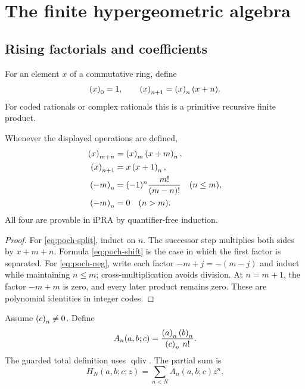 \section{The finite hypergeometric algebra}\label{sec:series}

\subsection{Rising factorials and coefficients}

\begin{definition}\label{def:pochhammer}
For an element \(x\) of a commutative ring, define
\[
  \left(x\right)_{0}=1,
  \qquad
  \left(x\right)_{n+1}=\left(x\right)_{n}(x+n).
\]
For coded rationals or complex rationals this is a primitive recursive finite
product.
\end{definition}

\begin{lemma}\label{lem:pochhammer}
Whenever the displayed operations are defined,
\begin{align}
 \left(x\right)_{m+n}&=\left(x\right)_{m}\left(x+m\right)_{n},\label{eq:poch-split}\\
 \left(x\right)_{n+1}&=x\left(x+1\right)_{n},\label{eq:poch-shift}\\
 \left(-m\right)_{n}&=(-1)^n\frac{m!}{(m-n)!}\quad(n\le m),\label{eq:poch-neg}\\
 \left(-m\right)_{n}&=0\quad(n>m).\label{eq:poch-zero}
\end{align}
All four are provable in iPRA by quantifier-free induction.
\end{lemma}

\begin{proof}
For \eqref{eq:poch-split}, induct on \(n\).  The successor step multiplies
both sides by \(x+m+n\).  Formula \eqref{eq:poch-shift} is the case in which
the first factor is separated.  For \eqref{eq:poch-neg}, write each factor
\(-m+j=-(m-j)\) and induct while maintaining \(n\le m\); cross-multiplication
avoids division.  At \(n=m+1\), the factor \(-m+m\) is zero, and every later
product remains zero.  These are polynomial identities in integer codes.
\end{proof}

\begin{definition}\label{def:gauss-coeff}
Assume \(\left(c\right)_{n}\ne0\).  Define
\[
 A_n(a,b;c)=\frac{\left(a\right)_{n}\left(b\right)_{n}}
                 {\left(c\right)_{n}\,n!}.
\]
The guarded total definition uses \(\operatorname{qdiv}\).  The partial sum is
\[
 H_N(a,b;c;z)=\sum_{n<N}A_n(a,b;c)z^n.
\]
\end{definition}

